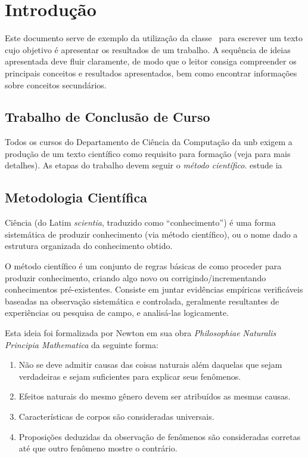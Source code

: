 \chapter{Introdução}%
Este documento serve de exemplo da utilização da classe \unbcic\ para escrever 
um texto cujo objetivo é apresentar os resultados de um trabalho. A sequência de 
ideias apresentada deve fluir claramente, de modo que o leitor consiga compreender 
os principais conceitos e resultados apresentados, bem como encontrar informações 
sobre conceitos secundários.


\section{Trabalho de Conclusão de Curso}%
Todos os cursos do Departamento de Ciência da Computação da \gls{unb} exigem a produção de um
texto científico como requisito para formação (veja 
para mais detalhes). As etapas do trabalho devem seguir o \emph{método científico}. estude \gls{ia}


\section{Metodologia Científica}%
Ciência (do Latim \emph{scientia}, traduzido como ``conhecimento'') é uma forma 
sistemática de produzir conhecimento (via método científico), ou o nome dado a 
estrutura organizada do conhecimento obtido.

O método científico é um conjunto de regras básicas de como proceder para produzir 
conhecimento, criando algo novo ou corrigindo/incrementando conhecimentos 
pré-existentes. Consiste em juntar evidências empíricas verificáveis baseadas na 
observação sistemática e controlada, geralmente resultantes de experiências ou 
pesquisa de campo, e analisá-las logicamente. 

Esta ideia foi formalizada por Newton em sua obra \emph{Philosophiae Naturalis 
Principia Mathematica} \cite{newton1833philosophiae} da seguinte forma:
\begin{enumerate}
	\item Não se deve admitir causas das coisas naturais além daquelas 
	que sejam verdadeiras e sejam suficientes para explicar seus fenômenos.
	\item Efeitos naturais do mesmo gênero devem ser atribuídos as mesmas causas.
	\item Características de corpos são consideradas universais.
	\item Proposições deduzidas da observação de fenômenos são 
	consideradas corretas até que outro fenômeno mostre o contrário.
\end{enumerate}%

